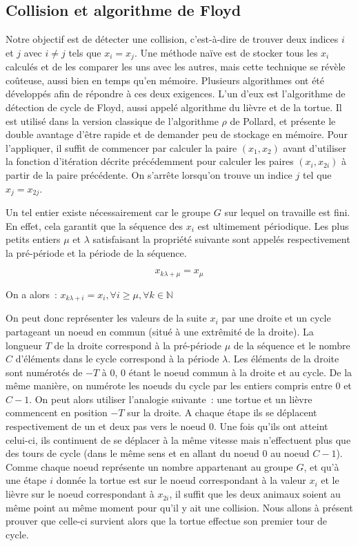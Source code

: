         \subsection{Collision et algorithme de Floyd}
	Notre objectif est de détecter une collision, c'est-à-dire de trouver deux indices $i$ et $j$ avec $i \ne j$ tels que $x_i = x_j$. Une méthode naïve est de stocker tous les $x_i$ calculés et de les comparer les uns avec les autres, mais cette technique se révèle coûteuse, aussi bien en temps qu'en mémoire. Plusieurs algorithmes ont été développés afin de répondre à ces deux exigences. L'un d'eux est l'algorithme de détection de cycle de Floyd, aussi appelé algorithme du lièvre et de la tortue. Il est utilisé dans la version classique de l'algorithme \texorpdfstring{$\rho$}{Rho} de Pollard, et présente le double avantage d'être rapide et de demander peu de stockage en mémoire. Pour l'appliquer, il suffit de commencer par calculer la paire $(x_1, x_2)$ avant d'utiliser la fonction d'itération décrite précédemment pour calculer les paires $(x_i, x_{2i})$ à partir de la paire précédente. On s'arrête lorsqu'on trouve un indice $j$ tel que $x_j = x_{2j}$.
				
	Un tel entier existe nécessairement car le groupe $G$ sur lequel on travaille est fini. En effet, cela garantit que la séquence des $x_i$ est ultimement périodique. Les plus petits entiers $\mu$ et $\lambda$ satisfaisant la propriété suivante sont appelés respectivement la pré-période et la période de la séquence.
				
	$$ x_{k\lambda+\mu} = x_\mu $$
				
	On a alors~: $ x_{k\lambda+i} = x_i, \forall i \ge \mu, \forall k \in \mathbb{N}$
				
	On peut donc représenter les valeurs de la suite $x_i$ par une droite et un cycle partageant un noeud en commun (situé à une extrêmité de la droite). La longueur $T$ de la droite correspond à la pré-période $\mu$ de la séquence et le nombre $C$ d'éléments dans le cycle correspond à la période $\lambda$. Les éléments de la droite sont numérotés de $-T$ à $0$, $0$ étant le noeud commun à la droite et au cycle. De la même manière, on numérote les noeuds du cycle par les entiers compris entre $0$ et $C-1$. On peut alors utiliser l'analogie suivante~: une tortue et un lièvre commencent en position $-T$ sur la droite. A chaque étape ils se déplacent respectivement de un et deux pas vers le noeud $0$. Une fois qu'ils ont atteint celui-ci, ils continuent de se déplacer à la même vitesse mais n'effectuent plus que des tours de cycle (dans le même sens et en allant du noeud $0$ au noeud $C-1$). Comme chaque noeud représente un nombre appartenant au groupe $G$, et qu'à une étape $i$ donnée la tortue est sur le noeud correspondant à la valeur $x_i$ et le lièvre sur le noeud correspondant à $x_{2i}$, il suffit que les deux animaux soient au même point au même moment pour qu'il y ait une collision. Nous allons à présent prouver que celle-ci survient alors que la tortue effectue son premier tour de cycle.
				

